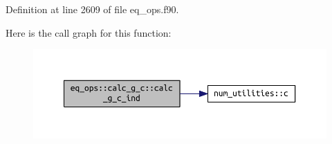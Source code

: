 Definition at line 2609 of file eq\+\_\+ops.\+f90.

Here is the call graph for this function\+:\nopagebreak
\begin{figure}[H]
\begin{center}
\leavevmode
\includegraphics[width=350pt]{interfaceeq__ops_1_1calc__g__c_a55dca52f3f82960703162dba425d358d_cgraph}
\end{center}
\end{figure}


